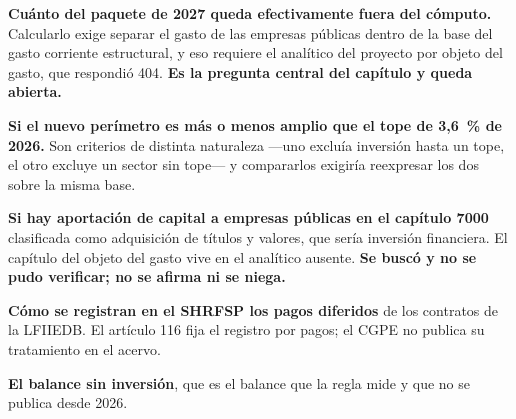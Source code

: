 \begin{list}{}{\setlength{\leftmargin}{1.4em}\setlength{\itemsep}{2pt}}
\item[$\bullet$] \textbf{Cuánto del paquete de 2027 queda efectivamente fuera del cómputo.}
Calcularlo exige separar el gasto de las empresas públicas dentro de la base del gasto
corriente estructural, y eso requiere el analítico del proyecto por objeto del gasto, que
respondió 404. \textbf{Es la pregunta central del capítulo y queda abierta.}
\item[$\bullet$] \textbf{Si el nuevo perímetro es más o menos amplio que el tope de 3,6~\%
de 2026.} Son criterios de distinta naturaleza ---uno excluía inversión hasta un tope, el
otro excluye un sector sin tope--- y compararlos exigiría reexpresar los dos sobre la misma
base.
\item[$\bullet$] \textbf{Si hay aportación de capital a empresas públicas en el capítulo
7000} clasificada como adquisición de títulos y valores, que sería inversión financiera. El
capítulo del objeto del gasto vive en el analítico ausente. \textbf{Se buscó y no se pudo
verificar; no se afirma ni se niega.}
\item[$\bullet$] \textbf{Cómo se registran en el SHRFSP los pagos diferidos} de los
contratos de la LFIIEDB. El artículo 116 fija el registro por pagos; el CGPE no publica su
tratamiento en el acervo.
\item[$\bullet$] \textbf{El balance sin inversión}, que es el balance que la regla mide y
que no se publica desde 2026.
\end{list}

